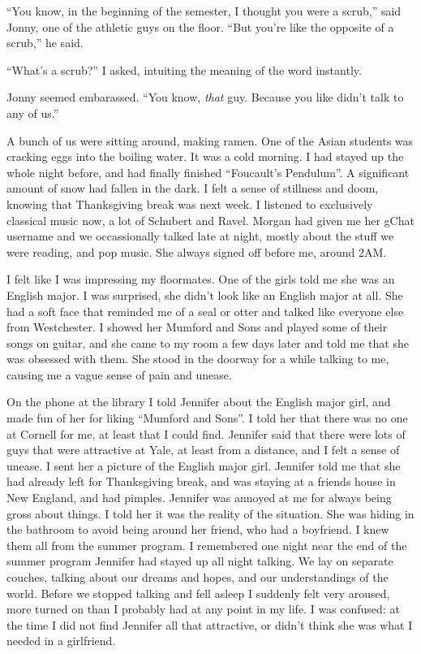 ``You know, in the beginning of the semester, I thought you were a scrub,'' said
Jonny, one of the athletic guys on the floor.  ``But you're like the opposite of
a scrub,'' he said.  

``What's a scrub?''  I asked, intuiting the meaning of the word instantly.

Jonny seemed embarassed.  ``You know, \textit{that} guy.  Because you like
didn't talk to any of us.''  

A bunch of us were sitting around, making ramen.  One of the Asian students was
cracking eggs into the boiling water.  It was a cold morning.  I had stayed up
the whole night before, and had finally finished ``Foucault's Pendulum''.  A
significant amount of snow had fallen in the dark.  I felt a sense of stillness
and doom, knowing that Thanksgiving break was next week.  I listened to
exclusively classical music now, a lot of Schubert and Ravel.  Morgan had given
me her gChat username and we occassionally talked late at night, mostly about
the stuff we were reading, and pop music.  She always signed off before me,
around 2AM.

I felt like I was impressing my floormates.  One of the girls told me she was an
English major.  I was surprised, she didn't look like an English major at all.
She had a soft face that reminded me of a seal or otter and talked like everyone
else from Westchester.  I showed her Mumford and Sons and played some of their
songs on guitar, and she came to my room a few days later and told me that she
was obsessed with them.  She stood in the doorway for a while talking to me,
causing me a vague sense of pain and unease.

On the phone at the library I told Jennifer about the English major girl, and
made fun of her for liking ``Mumford and Sons''.  I told her that there was no
one at Cornell for me, at least that I could find.  Jennifer said that there
were lots of guys that were attractive at Yale, at least from a distance, and I
felt a sense of unease.  I sent her a picture of the English major girl.
Jennifer told me that she had already left for Thanksgiving break, and was
staying at a friends house in New England, and had pimples.  Jennifer was
annoyed at me for always being gross about things.  I told her it was the
reality of the situation.  She was hiding in the bathroom to avoid being around
her friend, who had a boyfriend.  I knew them all from the summer program.  I
remembered one night near the end of the summer program Jennifer had stayed up
all night talking.  We lay on separate couches, talking about our dreams and
hopes, and our understandings of the world.  Before we stopped talking and fell
asleep I suddenly felt very aroused, more turned on than I probably had at any
point in my life.  I was confused: at the time I did not find Jennifer all that
attractive, or didn't think she was what I needed in a girlfriend.  

